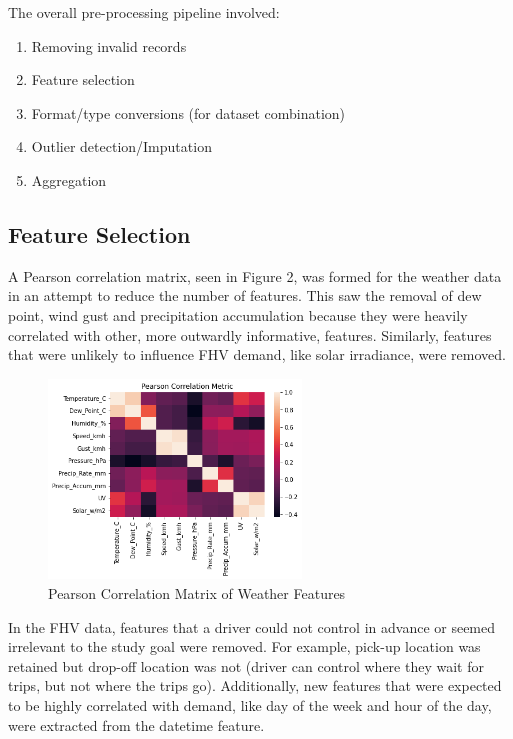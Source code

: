 \documentclass[11pt]{article}
\begin{document}
The overall pre-processing pipeline involved:
\begin{enumerate} 
    \item Removing invalid records
    \item Feature selection
    \item Format/type conversions (for dataset combination)
    \item Outlier detection/Imputation
    \item Aggregation
\end{enumerate}

\subsection{Feature Selection}

A Pearson correlation matrix, seen in Figure 2, was formed for the weather data in an attempt to reduce the number of features. This saw the removal of dew point, wind gust and precipitation accumulation because they were heavily correlated with other, more outwardly informative, features. Similarly, features that were unlikely to influence FHV demand, like solar irradiance, were removed.

\begin{figure}[h]
    \includegraphics[width=0.6\textwidth]{plots/weather_correlation.png}
    \centering
    \caption{Pearson Correlation Matrix of Weather Features}
\end{figure}

In the FHV data, features that a driver could not control in advance or seemed irrelevant to the study goal were removed. For example, pick-up location was retained but drop-off location was not (driver can control where they wait for trips, but not where the trips go). Additionally, new features that were expected to be highly correlated with demand, like day of the week and hour of the day, were extracted from the datetime feature.
\end{document}
